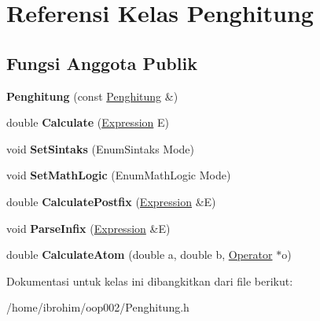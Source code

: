 \hypertarget{classPenghitung}{}\section{Referensi Kelas Penghitung}
\label{classPenghitung}
\subsection*{Fungsi Anggota Publik}
\begin{DoxyCompactItemize}
\item 
\hypertarget{classPenghitung_a131a947d8e8271a40c06617b537719bf}{}{\bfseries Penghitung} (const \hyperlink{classPenghitung}{Penghitung} \&)\label{classPenghitung_a131a947d8e8271a40c06617b537719bf}

\item 
\hypertarget{classPenghitung_abcbf8d577719bd02705f531ef1e013fe}{}double {\bfseries Calculate} (\hyperlink{classExpression}{Expression} E)\label{classPenghitung_abcbf8d577719bd02705f531ef1e013fe}

\item 
\hypertarget{classPenghitung_a76c0f4967242cca0960fabb9b86ba2cf}{}void {\bfseries Set\+Sintaks} (Enum\+Sintaks Mode)\label{classPenghitung_a76c0f4967242cca0960fabb9b86ba2cf}

\item 
\hypertarget{classPenghitung_a46dee4f8c173e684b09b8dd3766615f7}{}void {\bfseries Set\+Math\+Logic} (Enum\+Math\+Logic Mode)\label{classPenghitung_a46dee4f8c173e684b09b8dd3766615f7}

\item 
\hypertarget{classPenghitung_a68ce45c766e1d1f07003c003beec6c2f}{}double {\bfseries Calculate\+Postfix} (\hyperlink{classExpression}{Expression} \&E)\label{classPenghitung_a68ce45c766e1d1f07003c003beec6c2f}

\item 
\hypertarget{classPenghitung_a4e9e99d67eeae430a2fbbb8b72439ee4}{}void {\bfseries Parse\+Infix} (\hyperlink{classExpression}{Expression} \&E)\label{classPenghitung_a4e9e99d67eeae430a2fbbb8b72439ee4}

\item 
\hypertarget{classPenghitung_a2d317ce153b859048331ca0c86dcac96}{}double {\bfseries Calculate\+Atom} (double a, double b, \hyperlink{classOperator}{Operator} $\ast$o)\label{classPenghitung_a2d317ce153b859048331ca0c86dcac96}

\end{DoxyCompactItemize}


Dokumentasi untuk kelas ini dibangkitkan dari file berikut\+:\begin{DoxyCompactItemize}
\item 
/home/ibrohim/oop002/Penghitung.\+h\end{DoxyCompactItemize}
